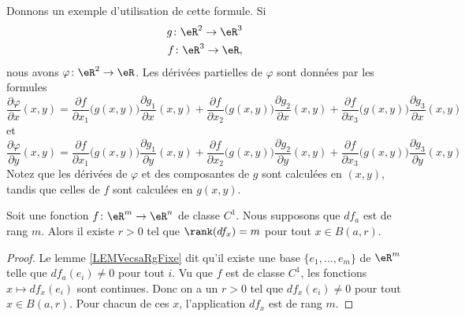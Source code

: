 Donnons un exemple d'utilisation de cette formule. Si
\begin{equation}
	\begin{aligned}[]
		g\colon \eR^2\to \eR^3 \\
		f\colon \eR^3\to \eR,
	\end{aligned}
\end{equation}
nous avons \( \varphi\colon \eR^2\to \eR\). Les dérivées partielles de \( \varphi\) sont données par les formules
\begin{equation}
	\frac{ \partial \varphi }{ \partial x }(x,y)=
	\frac{ \partial f }{ \partial x_1 }\big( g(x,y) \big)\frac{ \partial g_1 }{ \partial x }(x,y)
	+\frac{ \partial f }{ \partial x_2 }\big( g(x,y) \big)\frac{ \partial g_2 }{ \partial x }(x,y)
	+\frac{ \partial f }{ \partial x_3 }\big( g(x,y) \big)\frac{ \partial g_3 }{ \partial x }(x,y)
\end{equation}
et
\begin{equation}
	\frac{ \partial \varphi }{ \partial y }(x,y)=\frac{ \partial f }{ \partial x_1 }\big( g(x,y) \big)\frac{ \partial g_1 }{ \partial y }(x,y)+\frac{ \partial f }{ \partial x_2 }\big( g(x,y) \big)\frac{ \partial g_2 }{ \partial y }(x,y)+\frac{ \partial f }{ \partial x_3 }\big( g(x,y) \big)\frac{ \partial g_3 }{ \partial y }(x,y)
\end{equation}
Notez que les dérivées de \( \varphi\) et des composantes de \( g\) sont calculées en \( (x,y)\), tandis que celles de \( f\) sont calculées en \( g(x,y)\).

\begin{lemma}	\label{LEMooRSDHooDpNEjo}
	Soit une fonction \(f \colon \eR^m\to \eR^n  \) de classe \( C^1\). Nous supposons que \( df_a\) est de rang \( m\). Alors il existe \( r>0\) tel que \( \rank(df_x)=m\) pour tout \( x\in B(a,r)\).
\end{lemma}

\begin{proof}
	Le lemme \ref{LEMVecsaRgFixe} dit qu'il existe une base \( \{ e_1,\ldots,e_m \}\) de \( \eR^m\) telle que \( df_a(e_i)\neq 0\) pour tout \( i\). Vu que \( f\) est de classe \( C^1\), les fonctions \( x\mapsto df_x(e_i)\) sont continues. Donc on a un \( r>0\) tel que \( df_x(e_i)\neq 0\) pour tout \( x\in B(a,r)\). Pour chacun de ces \( x\), l'application \( df_x\) est de rang \( m\).
\end{proof}


